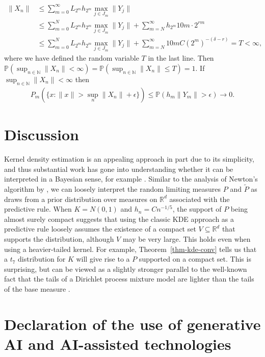 \documentclass[12pt]{article}
\newcommand{\R}{\mathbb{R}}
\newcommand{\N}{\mathbb{N}}
\newcommand{\bP}{\mathbb{P}}
\begin{document}
\begin{align*}
    \|X_n\| &\leq \sum_{m = 0}^{\infty} L_{2^m} h_{2^m} \max_{j \in J_{m}} \|Y_j\| \\
    &\leq \sum_{m = 0}^N L_{2^m} h_{2^m} \max_{j \in J_{m}} \|Y_j\| + \sum_{m = N}^\infty h_{2^m} 10m \cdot 2^{rm} \\
    &\leq \sum_{m = 0}^N L_{2^m} h_{2^m} \max_{j \in J_{m}} \|Y_j\|+ \sum_{m = N}^\infty 10mC (2^m)^{-(\delta - r)} = T < \infty,
\end{align*}
where we have defined the random variable $T$ in the last line. Then $\bP(\sup_{n \in \N} \|X_n\| < \infty) = \bP(\sup_{n \in \N} \|X_n\| \leq T) = 1$. If $\sup_{n \in \N} \|X_n\| < \infty$ then
\begin{align*}
    P_m(\{x : \|x\| > \sup_n \|X_n\| + \epsilon\}) \leq \bP(h_m \|Y_m\| > \epsilon) \to 0.
\end{align*}

\section{Discussion}\label{sec-conc}

Kernel density estimation is an appealing approach in part due to its simplicity, and thus substantial work has gone into understanding whether it can be interpreted in a Bayesian sense, for example \citet{west1991kernel}. Similar to the analysis of Newton's algorithm by \citet{fortini2020quasi}, we can loosely interpret the random limiting measures $P$ and $\tilde{P}$ as draws from a prior distribution over measures on $\R^d$ associated with the predictive rule.
When $K = N(0, 1)$ and $h_n = Cn^{-1/5}$, the support of $P$ being almost surely compact suggests that using the classic KDE approach as a predictive rule loosely assumes the existence of a compact set $V \subseteq \R^d$ that supports the distribution, although $V$ may be very large.
This holds even when using a heavier-tailed kernel. For example, Theorem~\ref{thm-kde-conv} tells us that a $t_7$ distribution for $K$ will give rise to a $P$ supported on a compact set. This is surprising, but can be viewed as a slightly stronger parallel to the well-known fact that the tails of a Dirichlet process mixture model are lighter than the tails of the base measure \citep{ghosal2017fundamentals}.  



\section*{Declaration of the use of generative AI and AI-assisted technologies}
\end{document}

